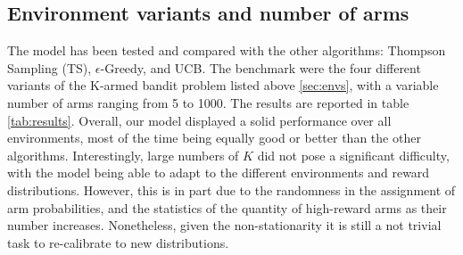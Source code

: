 \subsection{Environment variants and number of arms}

The model has been tested and compared with the other algorithms: Thompson Sampling (TS), $\epsilon$-Greedy, and UCB. The benchmark were the four different variants of the K-armed bandit problem listed above \ref{sec:envs}, with a variable number of arms ranging from 5 to 1000.
The results are reported in table \ref{tab:results}.
Overall, our model displayed a solid performance over all environments, most of the time being equally good or better than the other algorithms.
Interestingly, large numbers of $K$ did not pose a significant difficulty, with the model being able to adapt to the different environments and reward distributions.
However, this is in part due to the randomness in the assignment of arm probabilities, and the statistics of the quantity of high-reward arms as their number increases. Nonetheless, given the non-stationarity it is still a not trivial task to re-calibrate to new distributions.



